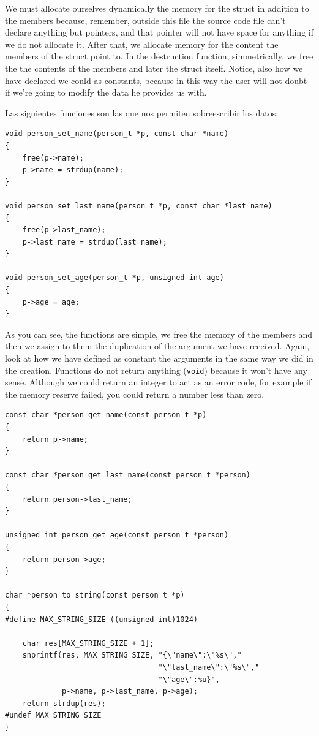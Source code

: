 \documentclass[a4paper]{article}
\begin{document}
We must allocate ourselves dynamically the memory for the struct in addition
to the members because, remember, outside this file the source code file can't
declare anything but pointers, and that pointer will not have space for anything
if we do not allocate it. After that, we allocate memory for the content the
members of the struct point to. In the destruction function, simmetrically,
we free the the contents of the members and later the struct itself. Notice,
also how we have declared we could as constants, because in this way the user
will not doubt if we're going to modify the data he provides us with.

Las siguientes funciones son las que nos permiten sobreescribir los datos:

\noindent
\begin{minipage}[H]{\linewidth}
\mbox{}
\begin{lstlisting}[style=C, label={lst:finalExSetter},
caption={Final example of program -- \texttt{person.c} manipulation}]
void person_set_name(person_t *p, const char *name)
{
    free(p->name);
    p->name = strdup(name);
}

void person_set_last_name(person_t *p, const char *last_name)
{
    free(p->last_name);
    p->last_name = strdup(last_name);
}

void person_set_age(person_t *p, unsigned int age)
{
    p->age = age;
}
\end{lstlisting}
\end{minipage}

As you can see, the functions are simple, we free the memory of the members and
then we assign to them the duplication of the argument we have received. Again,
look at how we have defined as constant the arguments in the same way we did in
the creation. Functions do not return anything (\verb!void!) because it won't
have any sense. Although we could return an integer to act as an error code,
for example if the memory reserve failed, you could return a number less than
zero.

\noindent
\begin{minipage}[H]{\linewidth}
\mbox{}
\begin{lstlisting}[style=C, label={lst:finalExGetter},
caption={Final example of program -- \texttt{person.c} retrieval}]
const char *person_get_name(const person_t *p)
{
    return p->name;
}

const char *person_get_last_name(const person_t *person)
{
    return person->last_name;
}

unsigned int person_get_age(const person_t *person)
{
    return person->age;
}

char *person_to_string(const person_t *p)
{
#define MAX_STRING_SIZE ((unsigned int)1024)

    char res[MAX_STRING_SIZE + 1];
    snprintf(res, MAX_STRING_SIZE, "{\"name\":\"%s\","
                                   "\"last_name\":\"%s\","
                                   "\"age\":%u}",
             p->name, p->last_name, p->age);
    return strdup(res);
#undef MAX_STRING_SIZE
}
\end{lstlisting}
\end{minipage}
\end{document}
